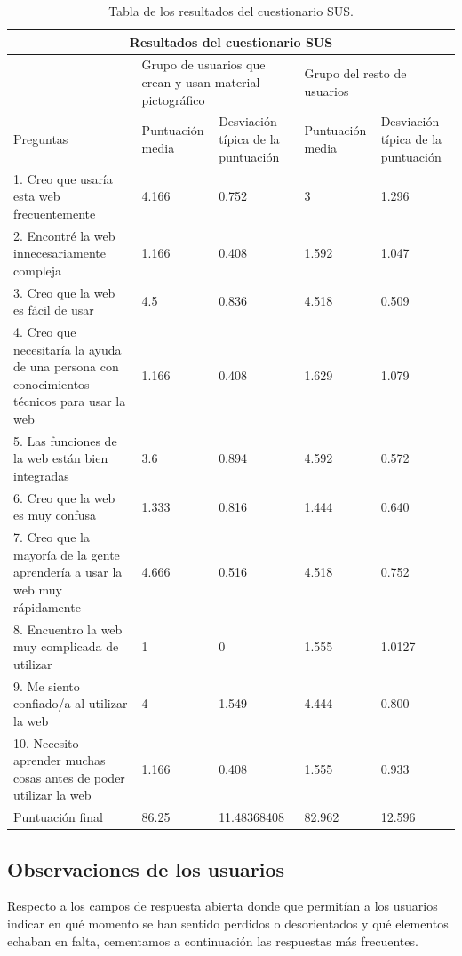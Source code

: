 \begin{table}
	
	\begin{tabular}{ |p{4cm}|p{2cm}|p{2cm}|p{2cm}|p{2cm}|  }
		\hline
		\multicolumn{5}{|c|}{Resultados del cuestionario SUS} \\
		\hline
		& \multicolumn{2}{p{4cm}|}{Grupo de usuarios que crean y usan material pictográfico} & \multicolumn{2}{p{4cm}|}{Grupo del resto de usuarios }  \\ 
		\hline
		Preguntas & Puntuación media  &Desviación típica de la puntuación & Puntuación media & Desviación típica de la puntuación\\
		\hline
		1. Creo que usaría esta web frecuentemente &4.166 &0.752 &3  &1.296\\
		\hline
		2. Encontré la web innecesariamente compleja &1.166  &0.408  &1.592 &1.047\\
		\hline
		3. Creo que la web es fácil de usar &4.5 &0.836 &4.518  &0.509\\
		\hline
		4. Creo que necesitaría la ayuda de una persona con conocimientos técnicos para usar la web &1.166 &0.408 &1.629  &1.079\\
		\hline
		5. Las funciones de la web están bien integradas &3.6 &0.894 &4.592 &0.572\\
		\hline
		6. Creo que la web es muy confusa &1.333  &0.816 &1.444 &0.640\\
		\hline
		7. Creo que la mayoría de la gente aprendería a usar la web muy rápidamente &4.666 &0.516  &4.518 &0.752\\
		\hline
		8. Encuentro la web muy complicada de utilizar &1 &0 &1.555 &1.0127 \\
		\hline
		9. Me siento confiado/a al utilizar la web &4 &1.549 &4.444  &0.800 \\
		\hline
		10. Necesito aprender muchas cosas antes de poder utilizar la web &1.166 &0.408 &1.555  &0.933 \\
		\hline
		Puntuación final &86.25 &11.48368408 &82.962 &12.596 \\
		\hline
	\end{tabular}
\caption{\label{tab:cuestionarioSUS}Tabla de los resultados del cuestionario SUS.}	
\end{table}


\subsection{Observaciones de los usuarios}
\label{cap6:sec:observaciones}
Respecto a los campos de respuesta abierta donde que permitían a los usuarios indicar en qué momento se han sentido perdidos o desorientados  y qué elementos echaban en falta, cementamos a continuación las respuestas más frecuentes. 

